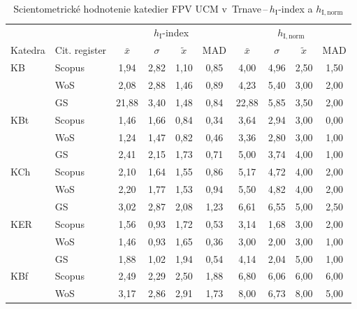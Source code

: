 \begin{table}
  \centering\small
  \caption[Hodnotenie FPV\,--\,$h_{\mathrm{I}}$-index a $h_{\mathrm{I,norm}}$]%
  {Scientometrické hodnotenie katedier FPV UCM v~Trnave\,--\,$h_{\mathrm{I}}$-index a $h_{\mathrm{I,norm}}$}
  \label{tab:4-staff.results}
  \begin{tabularx}{\textwidth}{XXcccc@{\hspace{3ex}}cccc}
    \toprule\noalign{\vspace{.3ex}}
    & & \multicolumn{4}{c}{$h_{\mathrm{I}}$-index} & \multicolumn{4}{c}{$h_{\mathrm{I,norm}}$} \\
    \cmidrule{3-6}\cmidrule{7-10}
    Katedra & Cit. register& $\bar{x}$ & $\sigma$ & $\tilde{x}$ & MAD & $\bar{x}$ & $\sigma$ & $\tilde{x}$ & MAD \\[0.3ex]
    \midrule\noalign{\vspace{.5ex}}
    KB   & Scopus & 1,94  & 2,82 & 1,10 & 0,85 & 4,00  & 4,96 & 2,50 & 1,50 \\
         & WoS    & 2,08  & 2,88 & 1,46 & 0,89 & 4,23  & 5,40 & 3,00 & 2,00 \\
         & GS     & 21,88 & 3,40 & 1,48 & 0,84 & 22,88 & 5,85 & 3,50 & 2,00 \\[3ex]
    KBt  & Scopus & 1,46  & 1,66 & 0,84 & 0,34 & 3,64  & 2,94 & 3,00 & 0,00 \\
         & WoS    & 1,24  & 1,47 & 0,82 & 0,46 & 3,36  & 2,80 & 3,00 & 1,00 \\
         & GS     & 2,41  & 2,15 & 1,73 & 0,71 & 5,00  & 3,74 & 4,00 & 1,00 \\[3ex]
    KCh  & Scopus & 2,10  & 1,64 & 1,55 & 0,86 & 5,17  & 4,72 & 4,00 & 2,00 \\
         & WoS    & 2,20  & 1,77 & 1,53 & 0,94 & 5,50  & 4,82 & 4,00 & 2,00 \\
         & GS     & 3,02  & 2,87 & 2,08 & 1,23 & 6,61  & 6,55 & 5,00 & 2,50 \\[3ex]
    KER  & Scopus & 1,56  & 0,93 & 1,72 & 0,53 & 3,14  & 1,68 & 3,00 & 2,00 \\
         & WoS    & 1,46  & 0,93 & 1,65 & 0,36 & 3,00  & 2,00 & 3,00 & 1,00 \\
         & GS     & 1,88  & 1,02 & 1,94 & 0,54 & 4,14  & 2,04 & 5,00 & 1,00 \\[3ex]
    KBf  & Scopus & 2,49  & 2,29 & 2,50 & 1,88 & 6,80  & 6,06 & 6,00 & 6,00 \\
         & WoS    & 3,17  & 2,86 & 2,91 & 1,73 & 8,00  & 6,73 & 8,00 & 5,00 \\

\end{tabularx}
\end{table}
